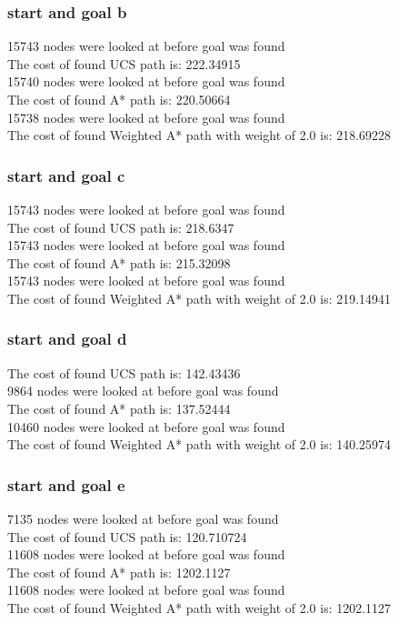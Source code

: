 \documentclass[11pt]{article} %
\begin{document}
\subsubsection{start and goal b}
15743 nodes were looked at before goal was found\\
The cost of found UCS path is: 222.34915\\
15740 nodes were looked at before goal was found\\
The cost of found A* path is: 220.50664\\
15738 nodes were looked at before goal was found\\
The cost of found Weighted A* path with weight of 2.0 is: 218.69228\\
\subsubsection{start and goal c}
15743 nodes were looked at before goal was found\\
The cost of found UCS path is: 218.6347\\
15743 nodes were looked at before goal was found\\
The cost of found A* path is: 215.32098\\
15743 nodes were looked at before goal was found\\
The cost of found Weighted A* path with weight of 2.0 is: 219.14941\\
\subsubsection{start and goal d}
The cost of found UCS path is: 142.43436\\
9864 nodes were looked at before goal was found\\
The cost of found A* path is: 137.52444\\
10460 nodes were looked at before goal was found\\
The cost of found Weighted A* path with weight of 2.0 is: 140.25974\\
\subsubsection{start and goal e}
7135 nodes were looked at before goal was found\\
The cost of found UCS path is: 120.710724\\
11608 nodes were looked at before goal was found\\
The cost of found A* path is: 1202.1127\\
11608 nodes were looked at before goal was found\\
The cost of found Weighted A* path with weight of 2.0 is: 1202.1127\\
\end{document}
